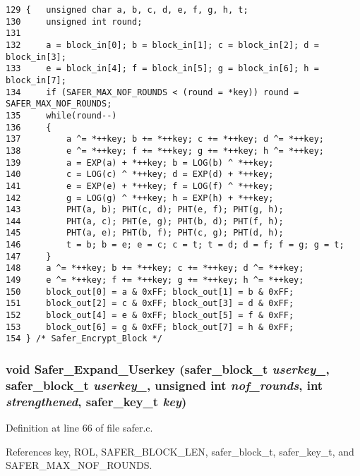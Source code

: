 \footnotesize\begin{verbatim}129 {   unsigned char a, b, c, d, e, f, g, h, t;
130     unsigned int round;
131 
132     a = block_in[0]; b = block_in[1]; c = block_in[2]; d = block_in[3];
133     e = block_in[4]; f = block_in[5]; g = block_in[6]; h = block_in[7];
134     if (SAFER_MAX_NOF_ROUNDS < (round = *key)) round = SAFER_MAX_NOF_ROUNDS;
135     while(round--)
136     {
137         a ^= *++key; b += *++key; c += *++key; d ^= *++key;
138         e ^= *++key; f += *++key; g += *++key; h ^= *++key;
139         a = EXP(a) + *++key; b = LOG(b) ^ *++key;
140         c = LOG(c) ^ *++key; d = EXP(d) + *++key;
141         e = EXP(e) + *++key; f = LOG(f) ^ *++key;
142         g = LOG(g) ^ *++key; h = EXP(h) + *++key;
143         PHT(a, b); PHT(c, d); PHT(e, f); PHT(g, h);
144         PHT(a, c); PHT(e, g); PHT(b, d); PHT(f, h);
145         PHT(a, e); PHT(b, f); PHT(c, g); PHT(d, h);
146         t = b; b = e; e = c; c = t; t = d; d = f; f = g; g = t;
147     }
148     a ^= *++key; b += *++key; c += *++key; d ^= *++key;
149     e ^= *++key; f += *++key; g += *++key; h ^= *++key;
150     block_out[0] = a & 0xFF; block_out[1] = b & 0xFF;
151     block_out[2] = c & 0xFF; block_out[3] = d & 0xFF;
152     block_out[4] = e & 0xFF; block_out[5] = f & 0xFF;
153     block_out[6] = g & 0xFF; block_out[7] = h & 0xFF;
154 } /* Safer_Encrypt_Block */
\end{verbatim}\normalsize 
{}
\subsubsection{\setlength{\rightskip}{0pt plus 5cm}void Safer\_\-Expand\_\-Userkey ({\bf safer\_\-block\_\-t} {\em userkey\_}, {\bf safer\_\-block\_\-t} {\em userkey\_}, unsigned int {\em nof\_\-rounds}, int {\em strengthened}, {\bf safer\_\-key\_\-t} {\em key})}\label{safer_8c_a9}




Definition at line 66 of file safer.c.

References key, ROL, SAFER\_\-BLOCK\_\-LEN, safer\_\-block\_\-t, safer\_\-key\_\-t, and SAFER\_\-MAX\_\-NOF\_\-ROUNDS.



